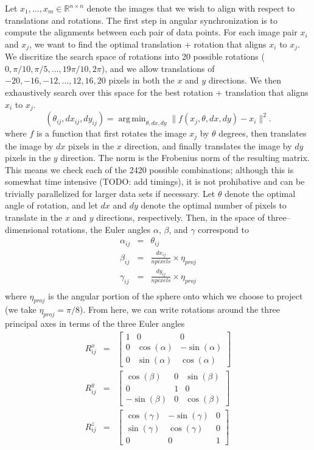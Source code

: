 \documentclass[12pt]{article}
\DeclareMathOperator*{\argmin}{arg\,min}
\begin{document}
Let $x_1, \dots, x_m \in \mathbb{R}^{n \times n}$ denote the images that we wish to align with respect to translations and rotations.
%
The first step in angular synchronization is to compute the alignments between each pair of data points. 
%
For each image pair $x_i$ and $x_j$, we want to find the optimal translation + rotation that aligns $x_i$ to $x_j$.
%
We discritize the search space of rotations into 20 possible rotations ($0, \pi/10, \pi/5, \dots, 19\pi/10, 2\pi$), and we allow translations of $-20, -16, -12, \dots, 12, 16, 20$ pixels in both the $x$ and $y$ directions. 
%
We then exhaustively search over this space for the best rotation + translation that aligns $x_i$ to $x_j$. 
\begin{equation}
(\theta_{ij}, dx_{ij}, dy_{ij}) = \argmin_{\theta, dx, dy} \|f(x_j, \theta, dx, dy) - x_i \|^2.
\end{equation}
where $f$ is a function that first rotates the image $x_j$ by $\theta$ degrees, then translates the image by $dx$ pixels in the $x$ direction, and finally translates the image by $dy$ pixels in the $y$ direction. 
%
The norm is the Frobenius norm of the resulting matrix. 
%
This means we check each of the 2420 possible combinations; although this is somewhat time intensive (TODO: add timings), it is not prohibative and can be trivially parallelized for larger data sets if necessary.
%
Let $\theta$ denote the optimal angle of rotation, and let $dx$ and $dy$ denote the optimal number of pixels to translate in the $x$ and $y$ directions, respectively.
%
Then, in the space of three--dimensional rotations, the Euler angles $\alpha$, $\beta$, and $\gamma$ correspond to
\begin{eqnarray}
	\alpha_{ij} &=& \theta_{ij} \\
	\beta_{ij} &=& \frac{dx_{ij}}{npixels} \times \eta_{proj} \\
	\gamma_{ij} &=& \frac{dy_{ij}}{npixels} \times \eta_{proj} \\
\end{eqnarray}
where $\eta_{proj}$ is the angular portion of the sphere onto which we choose to project (we take $\eta_{proj} =  \pi/8$).
%
From here, we can write rotations around the three principal axes in terms of the three Euler angles
\begin{eqnarray}
	R^x_{ij} &=& \begin{bmatrix}
	1 & 0 & 0 \\
    0 & \cos(\alpha) & -\sin(\alpha) \\
    0 & \sin(\alpha) & \cos(\alpha)
	\end{bmatrix} \\
	R^y_{ij} &=& \begin{bmatrix}
	\cos(\beta) & 0 & \sin(\beta) \\
    0 & 1 & 0 \\
    -\sin(\beta) & 0 & \cos(\beta)
    \end{bmatrix} \\
	R^z_{ij} &=& \begin{bmatrix} 
	\cos(\gamma) & -\sin(\gamma) & 0 \\
    \sin(\gamma) & \cos(\gamma) & 0 \\
    0 & 0 & 1 
    \end{bmatrix}
\end{eqnarray}
\end{document}
